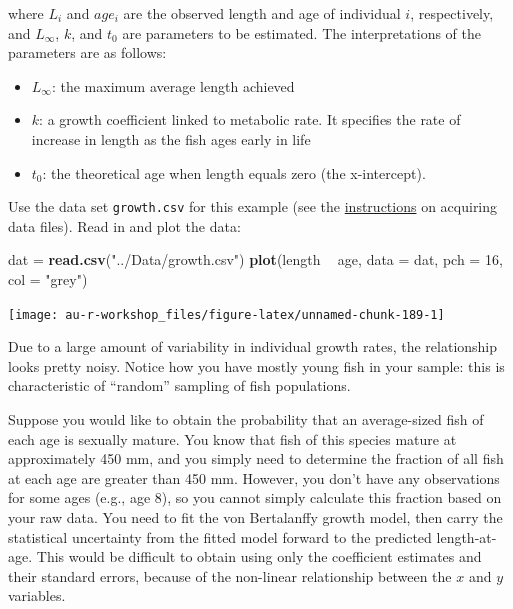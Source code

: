 \documentclass[]{book}
\newenvironment{Shaded}{\begin{snugshade}}{\end{snugshade}}
\newcommand{\KeywordTok}[1]{\textcolor[rgb]{0.13,0.29,0.53}{\textbf{#1}}}
\newcommand{\DataTypeTok}[1]{\textcolor[rgb]{0.13,0.29,0.53}{#1}}
\newcommand{\DecValTok}[1]{\textcolor[rgb]{0.00,0.00,0.81}{#1}}
\newcommand{\StringTok}[1]{\textcolor[rgb]{0.31,0.60,0.02}{#1}}
\newcommand{\OperatorTok}[1]{\textcolor[rgb]{0.81,0.36,0.00}{\textbf{#1}}}
\newcommand{\NormalTok}[1]{#1}
\providecommand{\tightlist}{%
  \setlength{\itemsep}{0pt}\setlength{\parskip}{0pt}}
\theoremstyle{definition}
\theoremstyle{definition}
\theoremstyle{definition}
\theoremstyle{remark}
\begin{document}
where \(L_i\) and \(age_i\) are the observed length and age of
individual \(i\), respectively, and \(L_{\infty}\), \(k\), and \(t_0\)
are parameters to be estimated. The interpretations of the parameters
are as follows:

\begin{itemize}
\tightlist
\item
  \(L_{\infty}\): the maximum average length achieved
\item
  \(k\): a growth coefficient linked to metabolic rate. It specifies the
  rate of increase in length as the fish ages early in life
\item
  \(t_0\): the theoretical age when length equals zero (the
  x-intercept).
\end{itemize}

Use the data set \texttt{growth.csv} for this example (see the
\protect\hyperlink{data-sets}{instructions} on acquiring data files).
Read in and plot the data:

\begin{Shaded}
\begin{Highlighting}[]
\NormalTok{dat =}\StringTok{ }\KeywordTok{read.csv}\NormalTok{(}\StringTok{"../Data/growth.csv"}\NormalTok{)}
\KeywordTok{plot}\NormalTok{(length }\OperatorTok{~}\StringTok{ }\NormalTok{age, }\DataTypeTok{data =}\NormalTok{ dat, }\DataTypeTok{pch =} \DecValTok{16}\NormalTok{, }\DataTypeTok{col =} \StringTok{"grey"}\NormalTok{)}
\end{Highlighting}
\end{Shaded}

\begin{center}\texttt{[image: au-r-workshop\_files/figure-latex/unnamed-chunk-189-1]} \end{center}

Due to a large amount of variability in individual growth rates, the
relationship looks pretty noisy. Notice how you have mostly young fish
in your sample: this is characteristic of ``random'' sampling of fish
populations.

Suppose you would like to obtain the probability that an average-sized
fish of each age is sexually mature. You know that fish of this species
mature at approximately 450 mm, and you simply need to determine the
fraction of all fish at each age are greater than 450 mm. However, you
don't have any observations for some ages (e.g., age 8), so you cannot
simply calculate this fraction based on your raw data. You need to fit
the von Bertalanffy growth model, then carry the statistical uncertainty
from the fitted model forward to the predicted length-at-age. This would
be difficult to obtain using only the coefficient estimates and their
standard errors, because of the non-linear relationship between the
\(x\) and \(y\) variables.
\end{document}
